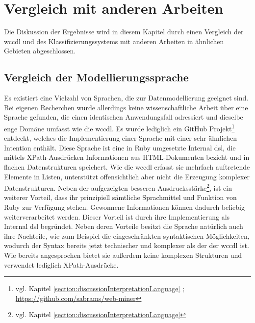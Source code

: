 \section{Vergleich mit anderen Arbeiten}
    Die Diskussion der Ergebnisse wird in diesem Kapitel
    durch einen Vergleich der \gls{wccdl} und des Klassifizierungssystems
    mit anderen Arbeiten in ähnlichen Gebieten abgeschlossen.

    \subsection{Vergleich der Modellierungssprache}
        \label{section:discussionComparisonLanguage}
        Es existiert eine Vielzahl von Sprachen,
        die zur Datenmodellierung geeignet sind.
        Bei eigenen Recherchen wurde allerdings keine wissenschaftliche Arbeit über eine Sprache gefunden,
        die einen identischen Anwendungsfall adressiert und dieselbe enge Domäne umfasst wie die \gls{wccdl}.
        Es wurde lediglich ein
        GitHub Projekt\footnote{vgl. Kapitel \ref{section:discussionInterpretationLanguage} ; \url{https://github.com/sabrams/web-miner}} entdeckt,
        welches die Implementierung einer Sprache mit einer sehr ähnlichen Intention enthält.
        Diese Sprache ist eine in Ruby umgesetzte Internal \gls{dsl},
        die mittels XPath-Ausdrücken Informationen aus HTML-Dokumenten bezieht
        und in flachen Datenstrukturen speichert.
        Wie die \gls{wccdl} erfasst sie mehrfach auftretende Elemente in Listen,
        unterstützt offensichtlich aber nicht die Erzeugung komplexer Datenstrukturen.
        Neben der aufgezeigten besseren
        Ausdrucksstärke\footnote{vgl. Kapitel \ref{section:discussionInterpretationLanguage}},
        ist ein weiterer Vorteil,
        dass ihr prinzipiell sämtliche Sprachmittel und Funktion von Ruby
        zur Verfügung stehen.
        Gewonnene Informationen können dadurch beliebig weiterverarbeitet werden.
        Dieser Vorteil ist durch ihre Implementierung als Internal \gls{dsl} begründet.
        Neben deren Vorteile besitzt die Sprache natürlich auch ihre Nachteile,
        wie zum Beispiel die eingeschränkten syntaktischen Möglichkeiten,
        wodurch der Syntax bereits jetzt technischer und komplexer als der der \gls{wccdl} ist.
        Wie bereits angesprochen bietet sie außerdem keine komplexen Strukturen und verwendet lediglich XPath-Ausdrücke.


